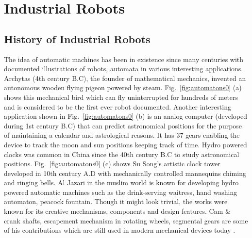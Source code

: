 \section{Industrial Robots}
\subsection{History of Industrial Robots}
The idea of automatic machines has been in existence since many centuries with documented illustrations of robots, automata in various interesting applications. Archytas (4th century B.C), the founder of mathematical mechanics, invented an autonomous wooden flying pigeon powered by steam. Fig.~\ref{fig:automatons0} (a) shows this mechanical bird which can fly uninterrupted for hundreds of meters and is considered to be the first ever robot documented. Another interesting application shown in Fig.~\ref{fig:automatons0} (b) is an analog computer (developed during 1st century B.C) that can predict astronomical positions for the purpose of maintaining a calendar and astrological reasons. It has 37 gears enabling the device to track the moon and sun positions keeping track of time. Hydro powered clocks was common in China since the 40th century B.C to study astronomical positions. Fig.~\ref{fig:automatons0} (c) shows Su Song's artistic clock tower developed in 10th century A.D with mechanically controlled mannequins chiming and ringing bells. Al Jazari in the muslim world is known for developing hydro powered automatic machines such as the drink-serving waitress, hand washing automaton, peacock fountain. Though it might look trivial, the works were known for its creative mechanisms, components and design features. Cam \& crank shafts, escapement mechanism in rotating wheels, segmental gears are some of his contributions which are still used in modern mechanical devices today \cite{hill2012book}.  

